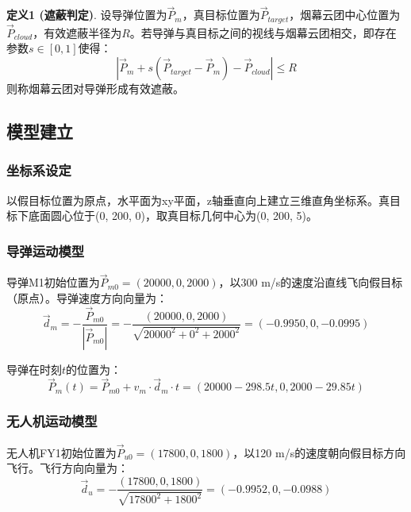 \documentclass[12pt,a4paper]{article}
\begin{document}
\noindent\textbf{定义1 (遮蔽判定)}. 设导弹位置为$\vec{P}_m$，真目标位置为$\vec{P}_{target}$，烟幕云团中心位置为$\vec{P}_{cloud}$，有效遮蔽半径为$R$。若导弹与真目标之间的视线与烟幕云团相交，即存在参数$s \in [0,1]$使得：
\begin{equation}
|\vec{P}_m + s(\vec{P}_{target} - \vec{P}_m) - \vec{P}_{cloud}| \leq R
\end{equation}
则称烟幕云团对导弹形成有效遮蔽。

\subsection{模型建立}

\subsubsection{坐标系设定}

\indent 以假目标位置为原点，水平面为xy平面，z轴垂直向上建立三维直角坐标系。真目标下底面圆心位于(0, 200, 0)，取真目标几何中心为(0, 200, 5)。

\subsubsection{导弹运动模型}

\indent 导弹M1初始位置为$\vec{P}_{m0} = (20000, 0, 2000)$，以300 m/s的速度沿直线飞向假目标（原点）。导弹速度方向向量为：
\begin{equation}
\vec{d}_m = -\frac{\vec{P}_{m0}}{|\vec{P}_{m0}|} = -\frac{(20000, 0, 2000)}{\sqrt{20000^2 + 0^2 + 2000^2}} = (-0.9950, 0, -0.0995)
\end{equation}

\indent 导弹在时刻$t$的位置为：
\begin{equation}
\vec{P}_m(t) = \vec{P}_{m0} + v_m \cdot \vec{d}_m \cdot t = (20000 - 298.5t, 0, 2000 - 29.85t)
\end{equation}

\subsubsection{无人机运动模型}

\indent 无人机FY1初始位置为$\vec{P}_{u0} = (17800, 0, 1800)$，以120 m/s的速度朝向假目标方向飞行。飞行方向向量为：
\begin{equation}
\vec{d}_u = -\frac{(17800, 0, 1800)}{\sqrt{17800^2 + 1800^2}} = (-0.9952, 0, -0.0988)
\end{equation}
\end{document}
